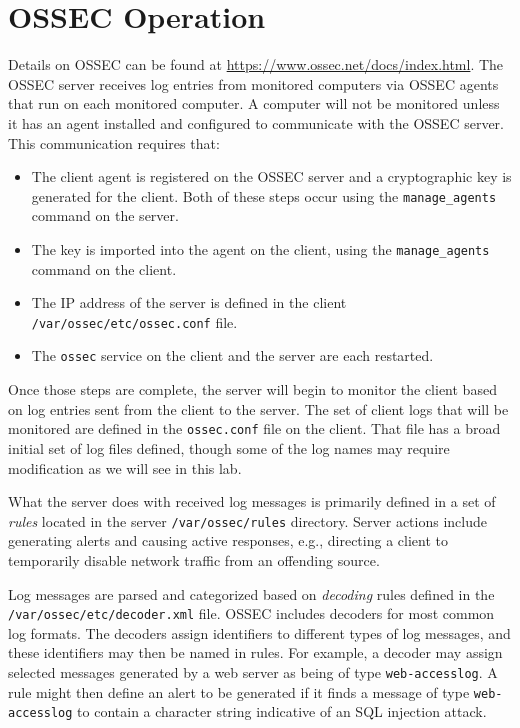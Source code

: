 \section{OSSEC Operation}
Details on OSSEC can be found at \url{https://www.ossec.net/docs/index.html}.
The OSSEC server receives log entries from monitored computers via OSSEC agents that run on each monitored computer.  
A computer will not be monitored unless it has an agent installed and configured to communicate with the OSSEC server.
This communication requires that:
\begin{itemize}
\item The client agent is registered on the OSSEC server and a cryptographic key is generated for the client.  Both
of these steps occur using the {\tt manage\_agents} command on the server.
\item The key is imported into the agent on the client, using the {\tt manage\_agents} command on the client.
\item The IP address of the server is defined in the client {\tt /var/ossec/etc/ossec.conf} file.
\item The {\tt ossec} service on the client and the server are each restarted.
\end{itemize}
Once those steps are complete, the server will begin to monitor the client based on log entries sent from the client
to the server.  The set of client logs that will be monitored are defined in the {\tt ossec.conf} file on the client.
That file has a broad initial set of log files defined, though some of the log names may require modification as we
will see in this lab.

What the server does with received log messages is primarily defined in a set of \textit{rules} located in the 
server {\tt /var/ossec/rules} 
directory.  Server actions include generating alerts and causing active responses, e.g., directing a client to temporarily disable
network traffic from an offending source.  

Log messages are parsed and categorized based on \textit{decoding} rules defined in the {\tt /var/ossec/etc/decoder.xml} file.
OSSEC includes decoders for most common log formats.  The decoders assign identifiers to different types of log messages,
and these identifiers may then be named in rules.  For example, a decoder may assign selected messages generated by a web
server as being of type {\tt web-accesslog}.  A rule might then define an alert to be generated if it finds a message of 
type {\tt web-accesslog} to contain a character string indicative of an SQL injection attack. 

